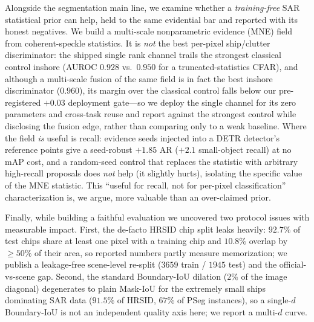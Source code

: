 Alongside the segmentation main line, we examine whether a \emph{training-free} SAR statistical prior can help, held to the same evidential bar and reported with its honest negatives. We build a multi-scale nonparametric evidence (MNE) field from coherent-speckle statistics. It is \emph{not} the best per-pixel ship/clutter discriminator: the shipped single rank channel trails the strongest classical control inshore (AUROC $0.928$ vs.\ $0.950$ for a truncated-statistics CFAR), and although a multi-scale fusion of the same field is in fact the best inshore discriminator ($0.960$), its margin over the classical control falls below our pre-registered $+0.03$ deployment gate---so we deploy the single channel for its zero parameters and cross-task reuse and report against the strongest control while disclosing the fusion edge, rather than comparing only to a weak baseline. Where the field \emph{is} useful is recall: evidence seeds injected into a DETR detector's reference points give a seed-robust $+1.85$ AR ($+2.1$ small-object recall) at no mAP cost, and a random-seed control that replaces the statistic with arbitrary high-recall proposals does \emph{not} help (it slightly hurts), isolating the specific value of the MNE statistic. This ``useful for recall, not for per-pixel classification'' characterization is, we argue, more valuable than an over-claimed prior.

Finally, while building a faithful evaluation we uncovered two protocol issues with measurable impact. First, the de-facto HRSID chip split leaks heavily: $92.7\%$ of test chips share at least one pixel with a training chip and $10.8\%$ overlap by $\ge\!50\%$ of their area, so reported numbers partly measure memorization; we publish a leakage-free scene-level re-split ($3659$ train / $1945$ test) and the official-vs-scene gap. Second, the standard Boundary-IoU dilation ($2\%$ of the image diagonal) degenerates to plain Mask-IoU for the extremely small ships dominating SAR data ($91.5\%$ of HRSID, $67\%$ of PSeg instances), so a single-$d$ Boundary-IoU is not an independent quality axis here; we report a multi-$d$ curve.

